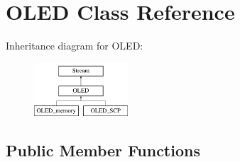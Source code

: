 \hypertarget{class_o_l_e_d}{}\section{O\+L\+ED Class Reference}
\label{class_o_l_e_d}
Inheritance diagram for O\+L\+ED\+:\begin{figure}[H]
\begin{center}
\leavevmode
\includegraphics[height=2.000000cm]{class_o_l_e_d}
\end{center}
\end{figure}
\subsection*{Public Member Functions}
